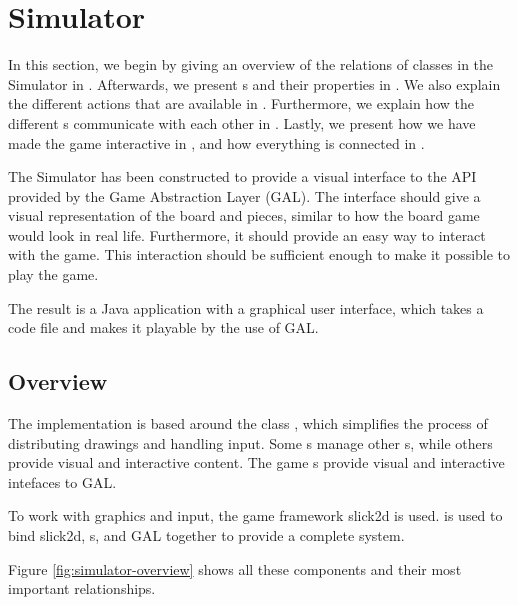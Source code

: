 \section{Simulator}
\label{sec:simulator-impl}

In this section, we begin by giving an overview of the relations of classes in
the Simulator in . Afterwards, we present
s and their properties in . We also explain
the different actions that are available in . Furthermore,
we explain how the different s communicate with each other in
. Lastly, we present how we have made the game
interactive in , and how everything is connected in
.


The Simulator has been constructed to provide a visual interface to the API
provided by the Game Abstraction Layer (GAL). The interface should give a visual
representation of the board and pieces, similar to how the board game would look
in real life. Furthermore, it should provide an easy way to interact with the
game. This interaction should be sufficient enough to make it possible to play
the game.

The result is a Java application with a graphical user interface, which takes a
\productname{} code file and makes it playable by the use of GAL.

\subsection{Overview}
\label{sec:overview}

The implementation is based around the class , which simplifies the
process of distributing drawings and handling input. Some s
manage other s, while others provide visual and interactive
content. The game s provide visual and interactive intefaces to
GAL.

To work with graphics and input, the game framework slick2d is used\cite{slick2d}.
 is used to bind slick2d, s, and GAL
together to provide a complete system.

Figure \ref{fig:simulator-overview} shows all these components and their most
important relationships.

